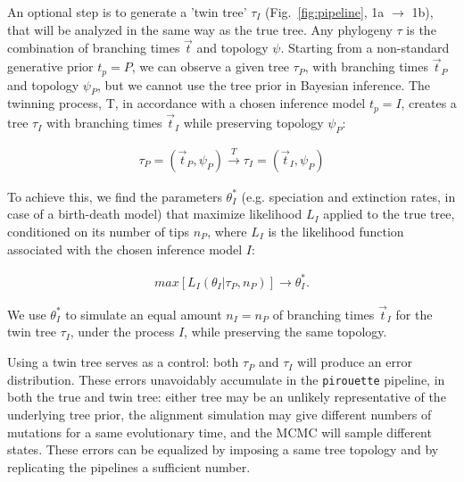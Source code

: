 \documentclass{article}
\begin{document}
An optional step is to generate a 'twin tree' $\tau_{I}$
(Fig.~\ref{fig:pipeline}, 1a $\rightarrow$ 1b),
that will be analyzed in the same way as the true tree.
Any phylogeny $\tau$ is the combination of 
branching times $\Vec{t}$ and topology $\psi$.
Starting from a non-standard generative prior $t_p = \mathit{P}$,
we can observe a given tree $\tau_{\mathit{P}}$,
with branching times $\Vec{t}_{\mathit{P}}$ and 
topology $\psi_{\mathit{P}}$, 
but we cannot use the tree prior in Bayesian inference.
The twinning process, T, in accordance with a chosen inference 
model $t_p = \mathit{I}$, creates a tree $\tau_{\mathit{I}}$
with branching times $\Vec{t}_{\mathit{I}}$ while preserving 
topology $\psi_{\mathit{P}}$:

\begin{align}
  \tau_{\mathit{P}} = (\Vec{t}_{\mathit{P}}, \psi_{\mathit{P}}) 
  \xrightarrow[]{\mathit{T}} 
  \tau_{\mathit{I}} = (\Vec{t}_{\mathit{I}}, \psi_{\mathit{P}})
\end{align}

To achieve this, we find the parameters $\theta^{*}_{\mathit{I}}$ 
(e.g. speciation and extinction rates, in case of a birth-death model) 
that maximize likelihood $L_{\mathit{I}}$ applied 
to the true tree, conditioned on its number of tips $n_{\mathit{P}}$,
where $L_{\mathit{I}}$ is  the likelihood function  
associated with the chosen inference model $\mathit{I}$:

\begin{align}
    max[L_{\mathit{I}}(\theta_{\mathit{I}}|\tau_{\mathit{P}}, n_{\mathit{P}})] 
\rightarrow \theta^{*}_{\mathit{I}}.
\end{align}

We use $\theta^{*}_{\mathit{I}}$ to simulate an equal amount 
$n_{\mathit{I}} = n_{\mathit{P}}$ 
of branching times $\Vec{t}_{\mathit{I}}$ for the twin tree 
$\tau_{\mathit{I}}$, under the process $\mathit{I}$, 
while preserving the same topology.

Using a twin tree serves as a control: both $\tau_{\mathit{P}}$ and 
$\tau_{\mathit{I}}$ will produce an error distribution. 
These errors unavoidably accumulate in the \verb;pirouette; pipeline,
in both the true and twin tree: either tree may be an unlikely representative
of the underlying tree prior, the alignment simulation may give different
numbers of mutations for a same evolutionary time, 
and the MCMC will sample different states.
These errors can be equalized by imposing a same tree topology and by
replicating the pipelines a sufficient number.
\end{document}
